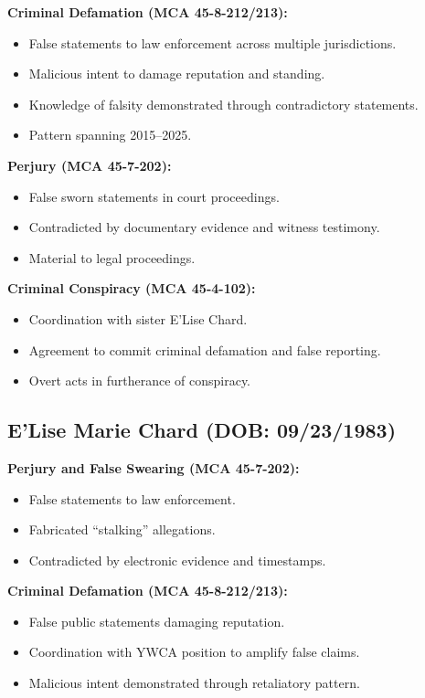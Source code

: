 \documentclass[12pt,oneside]{article}
\begin{document}
\begin{flushleft}
\textbf{Criminal Defamation (MCA 45-8-212/213):}

\begin{itemize}
\item False statements to law enforcement across multiple jurisdictions.
\item Malicious intent to damage reputation and standing.
\item Knowledge of falsity demonstrated through contradictory statements.
\item Pattern spanning 2015--2025.
\end{itemize}

\textbf{Perjury (MCA 45-7-202):}

\begin{itemize}
\item False sworn statements in court proceedings.
\item Contradicted by documentary evidence and witness testimony.
\item Material to legal proceedings.
\end{itemize}

\textbf{Criminal Conspiracy (MCA 45-4-102):}

\begin{itemize}
\item Coordination with sister E'Lise Chard.
\item Agreement to commit criminal defamation and false reporting.
\item Overt acts in furtherance of conspiracy.
\end{itemize}

\subsection*{E'Lise Marie Chard (DOB: 09/23/1983)}

\textbf{Perjury and False Swearing (MCA 45-7-202):}

\begin{itemize}
\item False statements to law enforcement.
\item Fabricated ``stalking'' allegations.
\item Contradicted by electronic evidence and timestamps.
\end{itemize}

\textbf{Criminal Defamation (MCA 45-8-212/213):}

\begin{itemize}
\item False public statements damaging reputation.
\item Coordination with YWCA position to amplify false claims.
\item Malicious intent demonstrated through retaliatory pattern.
\end{itemize}


\end{flushleft}
\end{document}
